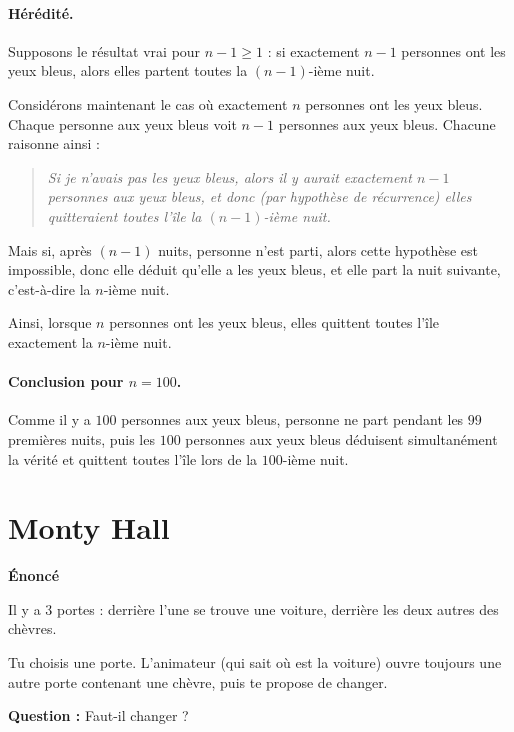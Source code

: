 \paragraph{Hérédité.}
Supposons le résultat vrai pour $n-1\ge 1$ : si exactement $n-1$ personnes ont les yeux bleus, alors elles partent toutes la $(n-1)$-ième nuit.

Considérons maintenant le cas où exactement $n$ personnes ont les yeux bleus.
Chaque personne aux yeux bleus voit $n-1$ personnes aux yeux bleus.
Chacune raisonne ainsi :
\begin{quote}
\emph{Si je n'avais pas les yeux bleus, alors il y aurait exactement $n-1$ personnes aux yeux bleus, et donc (par hypothèse de récurrence) elles quitteraient toutes l'île la $(n-1)$-ième nuit.}
\end{quote}
Mais si, après $(n-1)$ nuits, personne n'est parti, alors cette hypothèse est impossible, donc elle déduit qu'elle a les yeux bleus, et elle part la nuit suivante, c'est-à-dire la $n$-ième nuit.

Ainsi, lorsque $n$ personnes ont les yeux bleus, elles quittent toutes l'île exactement la $n$-ième nuit.

\paragraph{Conclusion pour $n=100$.}
Comme il y a $100$ personnes aux yeux bleus, personne ne part pendant les $99$ premières nuits, puis les $100$ personnes aux yeux bleus déduisent simultanément la vérité et quittent toutes l'île lors de la $100$-ième nuit.

\section{Monty Hall}

\begin{exerciseBox}
\textbf{Énoncé}

Il y a 3 portes : derrière l’une se trouve une voiture, derrière les deux autres des chèvres.

Tu choisis une porte.  
L’animateur (qui sait où est la voiture) ouvre toujours une autre porte contenant une chèvre, puis te propose de changer.

\textbf{Question :} Faut-il changer ? 




\end{exerciseBox}

